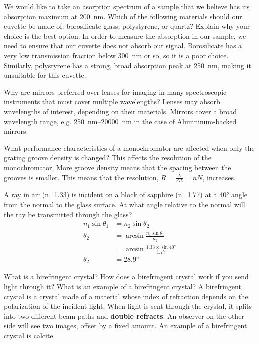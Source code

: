 \documentclass{hw}
\begin{document}

\problem{}
    We would like to take an asorption spectrum of a sample that we believe has its absorption maximum at \SI{200}{\nano\meter}. Which of the following materials should our cuvette be made of: borosilicate glass, polystyrene, or quartz? Explain why your choice is the best option.
\solution
    In order to measure the absorption in our sample, we need to ensure that our cuvette does not absorb our signal. Borosilicate has a very low transmission fraction below \SI{300}{\nano\meter} or so, so it is a poor choice. Similarly, polystyrene has a strong, broad absorption peak at \SI{250}{\nano\meter}, making it unsuitable for this cuvette.

\problem{}
    Why are mirrors preferred over lenses for imaging in many spectroscopic instruments that must cover multiple wavelengths?
\solution
    Lenses may absorb wavelengths of interest, depending on their materials. Mirrors cover a broad wavelength range, e.g. \SIrange[scientific-notation = engineering]{250}{20000}{\nano\meter} in the case of Alumninum-backed mirrors.

\problem{}
    What performance characteristics of a monochromator are affected when only the grating groove density is changed?
\solution
    This affects the resolution of the monochromator. More groove density means that the spacing between the grooves is smaller. This means that the resolution, $R = \frac{\lambda}{\Delta \lambda} = n N$, increases.

\problem{}
    A ray in air (n=\num{1.33}) is incident on a block of sapphire (n=\num{1.77}) at a \ang{40} angle from the normal to the glass surface. At what angle relative to the normal will the ray be transmitted through the glass?
\solution
    \begin{align*}
        n_1 \sin \theta_1 &= n_2 \sin \theta_2 \\
        \theta_2 &= \arcsin \frac{n_1 \sin \theta_1}{n_2} \\
        &= \arcsin \frac{\num{1.33} \times \sin \ang{40}}{\num{1.77}} \\
        \theta_2 &= \ang{28.9}
    \end{align*}

\problem{}
    What is a birefringent crystal? How does a birefringent crystal work if you send light through it? What is an example of a birefringent crystal?
\solution
    A birefringent crystal is a crystal made of a material whose index of refraction depends on the polarization of the incident light. When light is sent through the crystal, it splits into two different beam paths and \textbf{double refracts}. An observer on the other side will see two images, offset by a fixed amount. An example of a birefringent crystal is calcite.
\end{document}
